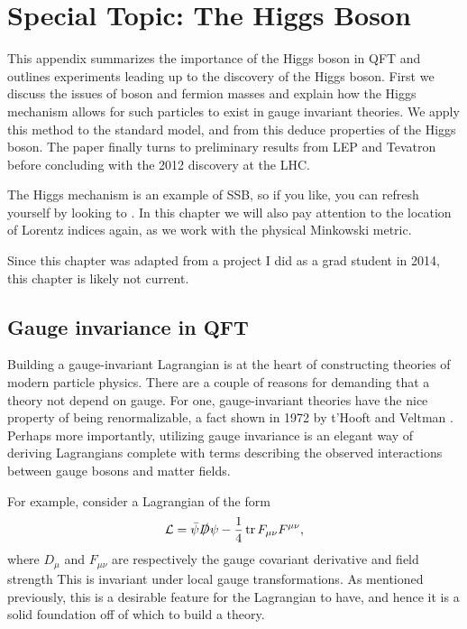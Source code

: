 \chapter{Special Topic: The Higgs Boson}\label{ap:spec_higgs}

This appendix summarizes the importance of the Higgs boson in QFT and outlines
experiments leading up to the discovery of the Higgs boson.
First we discuss the issues of boson and fermion masses and explain
how the Higgs mechanism allows for such particles to exist in gauge invariant
theories. We apply this method to the standard model, and from this deduce
properties of the Higgs boson. The paper finally turns to preliminary results 
from LEP and Tevatron before concluding with the 2012 discovery at the LHC.

The Higgs mechanism is an example of SSB, so if you like, you can refresh
yourself by looking to . In this chapter we will
also pay attention to the location of Lorentz indices again, as we
work with the physical Minkowski metric.

Since this chapter was adapted from a project I did as a grad student in 2014,
this chapter is likely not current.

\section{Gauge invariance in QFT}

Building a gauge-invariant Lagrangian is at the heart of constructing theories
of modern particle physics. There are a couple of reasons for demanding that a
theory not depend on gauge. For one, gauge-invariant theories have the nice
property of being renormalizable, a fact shown in 1972 by t'Hooft and Veltman 
\cite{t_hooft_regularization_1972}. Perhaps more importantly, utilizing gauge
invariance is an elegant way of deriving Lagrangians complete with terms
describing the observed interactions between gauge bosons and matter fields.

For example, consider a Lagrangian of the form
\begin{equation}
  \label{eq:genLagr}
  \mathcal{L}=\bar{\psi}\slashed{D}\psi-\frac{1}{4}\tr F_{\mu\nu}F^{\mu\nu} ,
\end{equation}
where $D_{\mu}$ and $F_{\mu\nu}$ are respectively the gauge covariant
derivative and field strength
This is invariant under local gauge transformations. 
As mentioned previously, this is a desirable feature for the
Lagrangian to have, and hence it is a solid foundation off of which to build
a theory.


